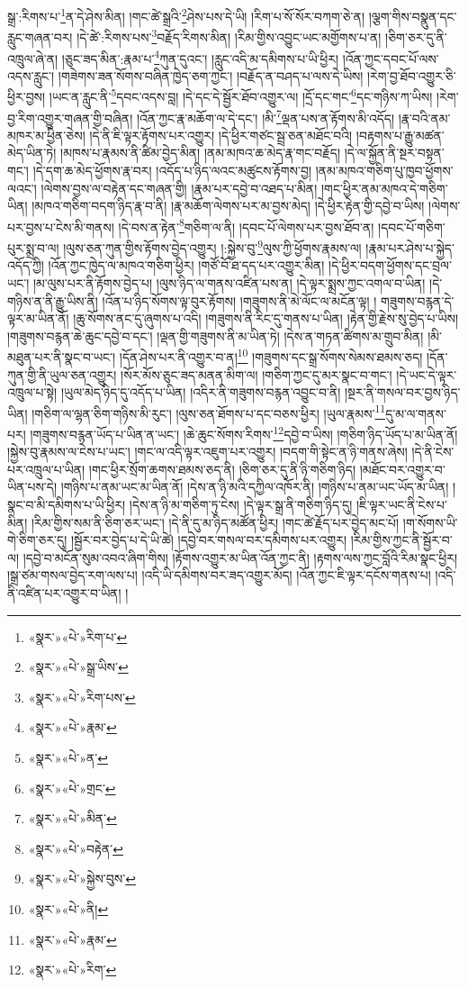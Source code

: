 སྒྲ་:རིགས་པ་\footnote{«སྣར་»«པེ་»རིག་པ་}ན་དེ་ཤེས་མིན། །གང་ཚེ་སྒྲའི་\footnote{«སྣར་»«པེ་»སྒྲ་ཡིས་}ཤེས་པས་དེ་ཡི། །རིག་པ་སོ་སོར་བཀག་ཅེ་ན། །ལྕག་གིས་བསྣུན་དང་རླུང་གཞན་བར། །དེ་ཚེ་:རིགས་པས་\footnote{«སྣར་»«པེ་»རིག་པས་}བརྗོད་རིགས་མིན། །རིམ་གྱིས་འབྱུང་ཡང་མགྱོགས་པ་ན། །ཅིག་ཅར་དུ་ནི་འཁྲུལ་ཞེ་ན། །ཅུང་ཟད་མིན་:རྣམ་པ་\footnote{«སྣར་»«པེ་»རྣམ་}ཀུན་དུའང་། །རླུང་འདི་མ་དམིགས་པ་ཡི་ཕྱིར། །འོན་ཀྱང་དབང་པོ་ལས་འདས་རླུང་། །གཟེགས་ཟན་སོགས་བཞིན་ཁྱེད་ཅག་ཀྱང་། །བརྗོད་ན་བཤད་པ་ལས་དེ་ཡིས། །རེག་བྱ་ཐོབ་འགྱུར་ཅི་ཕྱིར་བྱས། །ཡང་ན་རླུང་ནི་\footnote{«སྣར་»«པེ་»ན་}དབང་འདས་བླ། །དེ་དང་དེ་སྦྱོར་ཐོབ་འགྱུར་ལ། །དྲོ་དང་གང་\footnote{«སྣར་»«པེ་»གྲང་}དང་གཉིས་ཀ་ཡིས། །རེག་བྱ་རིག་འགྱུར་གཞན་གྱི་བཞིན། །འོན་ཀྱང་རྣ་མཆོག་ལ་དེ་དང་། །མི་\footnote{«སྣར་»«པེ་»མིན་}ལྡན་པས་ན་རྟོགས་མི་འདོད། །རྣ་བའི་ནམ་མཁར་མ་ཕྱིན་ཅེས། །དེ་ནི་ཇི་ལྟར་རྟོགས་པར་འགྱུར། །དེ་ཕྱིར་གཙང་སྦྲ་ཅན་མཐོང་བའི། །བརྟགས་པ་རྒྱུ་མཚན་མེད་ཡིན་ཏེ། །མཁས་པ་རྣམས་ནི་ཚིམ་བྱེད་མིན། །ནམ་མཁའ་ཆ་མེད་རྣ་གང་བརྗོད། །དེ་ལ་སྐྱོན་ནི་སྔར་བསྟན་གང་། །དེ་དག་ཆ་མེད་ཕྱོགས་རྣ་བར། །འདོད་པ་ཉིད་ལའང་མཚུངས་རྟོགས་བྱ། །ནམ་མཁའ་གཅིག་པུ་ཁྱབ་ཕྱོགས་ལའང་། །ལེགས་བྱས་ལ་བརྟེན་དང་གཞན་གྱི། །རྣམ་པར་དབྱེ་བ་འཐད་པ་མིན། །གང་ཕྱིར་ནམ་མཁའ་དེ་གཅིག་ཡིན། །མཁའ་གཅིག་བདག་ཉིད་རྣ་བ་ནི། །རྣ་མཆོག་ལེགས་པར་མ་བྱས་མེད། །དེ་ཕྱིར་རྟེན་གྱི་དབྱེ་བ་ཡིས། །ལེགས་པར་བྱས་པ་ངེས་མི་གནས། །དེ་བས་ན་རྟེན་\footnote{«སྣར་»«པེ་»བརྟེན་}གཅིག་ལ་ནི། །དབང་པོ་ལེགས་པར་བྱས་ཐོབ་ན། །དབང་པོ་གཅིག་པུར་སྨྲ་བ་ལ། །ལུས་ཅན་ཀུན་གྱིས་རྟོགས་བྱེད་འགྱུར། །:སྐྱེས་བུ་\footnote{«སྣར་»«པེ་»སྐྱེས་བུས་}ལུས་ཀྱི་ཕྱོགས་རྣམས་ལ། །རྣམ་པར་ཤེས་པ་སྐྱེད་འདོད་ཀྱི། །འོན་ཀྱང་ཁྱེད་ལ་མཁའ་གཅིག་ཕྱིར། །གཙོ་བོ་ཐ་དད་པར་འགྱུར་མིན། །དེ་ཕྱིར་བདག་ཕྱོགས་དང་བྲལ་ཡང་། །མ་ལུས་པར་ནི་རྟོགས་བྱེད་པ། །ལུས་ཉིད་ལ་གནས་འཛིན་པས་ན། །དེ་ལྟར་སྨྲས་ཀྱང་འགལ་བ་ཡིན། །དེ་གཉིས་ན་ནི་རྒྱུ་ཡིས་ནི། །འོན་པ་ཉིད་སོགས་ལྟ་བུར་རྟོགས། །གཟུགས་ནི་མེ་ལོང་ལ་མངོན་ལྟ། །
གཟུགས་བརྙན་དེ་ལྟར་མ་ཡིན་ནོ། །ཆུ་སོགས་ནང་དུ་ཞུགས་པ་འདི། །གཟུགས་ནི་རིང་དུ་གནས་པ་ཡིན། །རྟེན་གྱི་རྗེས་སུ་བྱེད་པ་ཡིས། །གཟུགས་བརྙན་ཆེ་ཆུང་དབྱེ་བ་དང་། །ལྡན་གྱི་གཟུགས་ནི་མ་ཡིན་ཏེ། །དེས་ན་གཏན་ཚིགས་མ་གྲུབ་མིན། །མི་མཐུན་པར་ནི་སྣང་བ་ཡང་། །དོན་ཤེས་པར་ནི་འགྱུར་བ་ན།\footnote{«སྣར་»«པེ་»ནི།} །གཟུགས་དང་སྒྲ་སོགས་སེམས་ཐམས་ཅད། །དོན་ཀུན་གྱི་ནི་ཡུལ་ཅན་འགྱུར། །སོར་མོས་ཅུང་ཟད་མནན་མིག་ལ། །གཅིག་ཀྱང་དུ་མར་སྣང་བ་གང་། །དེ་ཡང་དེ་ལྟར་འཁྲུལ་པ་སྟེ། །ཡུལ་མེད་ཉིད་དུ་འདོད་པ་ཡིན། །འདིར་ནི་གཟུགས་བརྙན་འབྱུང་བ་ནི། །སྔར་ནི་གསལ་བར་བྱས་ཉིད་ཡིན། །གཅིག་ལ་ལྷན་ཅིག་གཉིས་མི་རུང་། །ལུས་ཅན་ཐོགས་པ་དང་བཅས་ཕྱིར། །ཡུལ་རྣམས་\footnote{«སྣར་»«པེ་»རྣམ་}དུ་མ་ལ་གནས་པར། །གཟུགས་བརྙན་ཡོད་པ་ཡིན་ན་ཡང་། །ཆེ་ཆུང་སོགས་རིགས་\footnote{«སྣར་»«པེ་»རིག་}དབྱེ་བ་ཡིས། །གཅིག་ཉིད་ཡོད་པ་མ་ཡིན་ནོ། །སྐྱེས་བུ་རྣམས་ལ་ངེས་པ་ཡང་། །གང་ལ་འདི་ལྟར་འཇུག་པར་འགྱུར། །བདག་གི་སྟེང་ན་ཉི་གནས་ཞེས། །དེ་ནི་ངེས་པར་འཁྲུལ་པ་ཡིན། །གང་ཕྱིར་སྲོག་ཆགས་ཐམས་ཅད་ནི། །ཅིག་ཅར་དུ་ནི་ཉི་གཅིག་ཉིད། །མཐོང་བར་འགྱུར་བ་ཡིན་པས་དེ། །གཉིས་པ་ནམ་ཡང་མ་ཡིན་ནོ། །དེས་ན་ཉི་མའི་དཀྱིལ་འཁོར་ནི། །གཉིས་པ་ནམ་ཡང་ཡོད་མ་ཡིན། །སྣང་བ་མི་དམིགས་པ་ཡི་ཕྱིར། །དེས་ན་ཉི་མ་གཅིག་ཏུ་ངེས། །དེ་ལྟར་སྒྲ་ནི་གཅིག་ཉིད་དུ། །ཇི་ལྟར་ཡང་ནི་ངེས་པ་མིན། །རིམ་གྱིས་སམ་ནི་ཅིག་ཅར་ཡང་། །དེ་ནི་དུ་མ་ཉིད་མཚོན་ཕྱིར། །གང་ཚེ་རྗོད་པར་བྱེད་མང་པོ། །ག་སོགས་ཡི་གེ་ཅིག་ཅར་དུ། །སྦྱོར་བར་བྱེད་པ་དེ་ཡི་ཚེ། །དབྱེ་བར་གསལ་བར་དམིགས་པར་འགྱུར། །རིམ་གྱིས་ཀྱང་ནི་སྦྱོར་བ་ལ། །དབྱེ་བ་མངོན་སུམ་འབའ་ཞིག་གིས། །རྟོགས་འགྱུར་མ་ཡིན་འོན་ཀྱང་ནི། །རྟགས་ལས་ཀྱང་བློའི་རིམ་སྣང་ཕྱིར། །སྒྲ་ཙམ་གསལ་བྱེད་རག་ལས་པ། །འདི་ཡི་དམིགས་བར་ཟད་འགྱུར་མོད། །འོན་ཀྱང་ཇི་ལྟར་དངོས་གནས་པ། །འདི་ནི་འཛིན་པར་འགྱུར་བ་ཡིན། །
